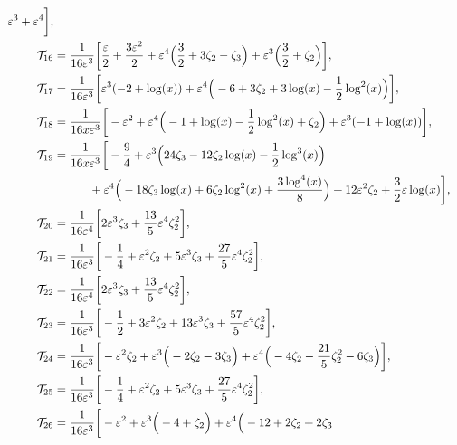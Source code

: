 \begin{align}
% 
\ep^3
+\ep^4
% 
\bigg],
% 
\nonumber\\
% 
\mi_{16} &=   \frac{1}{16 \ep^3}  \bigg[
% 
\frac{\ep}{2}
+\frac{3 \ep^2}{2}
+\ep^4 \Big(
        \frac{3}{2}
        +3 \zeta_2
        -\zeta_3
\Big)
+\ep^3 \Big(
        \frac{3}{2}
        +\zeta_2
\Big)
% 
\bigg],
% 
\nonumber\\
% 
\mi_{17} &=   \frac{1}{16 \ep^3}  \bigg[
% 
\ep^3 (-2+\log (x))
+\ep^4 \Big(
        -6
        +3 \zeta_2
        +3 \log (x)
        -\frac{1}{2} \log ^2(x)
\Big)
% 
\bigg],
% 
\nonumber\\
% 
\mi_{18} &=   \frac{1}{16 x \ep^3}  \bigg[
% 
-\ep^2
+\ep^4 \Big(
        -1
        +\log (x)
        -\frac{1}{2} \log ^2(x)
        +\zeta_2
\Big)
+\ep^3 (-1+\log (x))
% 
\bigg],
% 
\nonumber\\
% 
\mi_{19} &=   \frac{1}{16 x \ep^3}  \bigg[
% 
-\frac{9}{4}
+\ep^3 \Big(
        24 \zeta_3
        -12 \zeta_2 \log (x)
        -\frac{1}{2} \log ^3(x)
\Big)
\nonumber\\& \qquad \quad
+\ep^4 \Big(
        -18 \zeta_3 \log (x)
        +6 \zeta_2 \log ^2(x)
        +\frac{3 \log ^4(x)}{8}
\Big)
+12 \ep^2 \zeta_2
+\frac{3}{2} \ep \log (x)
% 
\bigg],
% 
\nonumber\\
% 
\mi_{20} &=   \frac{1}{16 \ep^4}  \bigg[
% 
2 \ep^3 \zeta_3
+\frac{13}{5} \ep^4 \zeta_2^2
% 
\bigg],
% 
\nonumber\\
% 
\mi_{21} &=   \frac{1}{16 \ep^3}  \bigg[
% 
-\frac{1}{4}
+\ep^2 \zeta_2
+5 \ep^3 \zeta_3
+\frac{27}{5} \ep^4 \zeta_2^2
% 
\bigg],
% 
\nonumber\\
% 
\mi_{22} &=   \frac{1}{16 \ep^4}  \bigg[
% 
2 \ep^3 \zeta_3
+\frac{13}{5} \ep^4 \zeta_2^2
% 
\bigg],
% 
\nonumber\\
% 
\mi_{23} &=   \frac{1}{16 \ep^3}  \bigg[
% 
-\frac{1}{2}
+3 \ep^2 \zeta_2
+13 \ep^3 \zeta_3
+\frac{57}{5} \ep^4 \zeta_2^2
% 
\bigg],
% 
\nonumber\\
% 
\mi_{24} &=   \frac{1}{16 \ep^3}  \bigg[
% 
-\ep^2 \zeta_2
+\ep^3 \Big(
        -2 \zeta_2
        -3 \zeta_3
\Big)
+\ep^4 \Big(
        -4 \zeta_2
        -\frac{21}{5} \zeta_2^2
        -6 \zeta_3
\Big)
\bigg],
% 
\nonumber\\
% 
\mi_{25} &=   \frac{1}{16 \ep^3}  \bigg[
% 
-\frac{1}{4}
+\ep^2 \zeta_2
+5 \ep^3 \zeta_3
+\frac{27}{5} \ep^4 \zeta_2^2
% 
\bigg],
% 
\nonumber\\
% 
\mi_{26} &=   \frac{1}{16 \ep^3}  \bigg[
% 
-\ep^2
+\ep^3 \Big(
        -4
        +\zeta_2
\Big)
+\ep^4 \Big(
        -12
        +2 \zeta_2
        +2 \zeta_3

\end{align}
